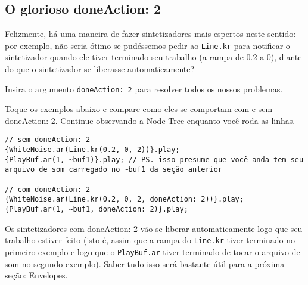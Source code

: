 \subsection{O glorioso doneAction: 2}

Felizmente, há uma maneira de fazer sintetizadores mais espertos neste sentido: por exemplo, não seria ótimo se pudéssemos pedir ao \texttt{Line.kr} para notificar o sintetizador quando ele tiver terminado seu trabalho (a rampa de 0.2 a 0), diante do que o sintetizador se liberasse automaticamente?


Insira o argumento \texttt{doneAction: 2} para resolver todos os nossos problemas.

Toque os exemplos abaixo e compare como eles se comportam com e sem doneAction: 2. Continue observando a Node Tree enquanto você roda as linhas.
 
\begin{lstlisting}[style=SuperCollider-IDE, basicstyle=\scttfamily\footnotesize]
// sem doneAction: 2
{WhiteNoise.ar(Line.kr(0.2, 0, 2))}.play;
{PlayBuf.ar(1, ~buf1)}.play; // PS. isso presume que você anda tem seu arquivo de som carregado no ~buf1 da seção anterior

// com doneAction: 2
{WhiteNoise.ar(Line.kr(0.2, 0, 2, doneAction: 2))}.play;
{PlayBuf.ar(1, ~buf1, doneAction: 2)}.play;
\end{lstlisting}
 
Os sintetizadores com doneAction: 2 vão se liberar automaticamente logo que seu trabalho estiver feito (isto é, assim que a rampa do \texttt{Line.kr} tiver terminado no primeiro exemplo e logo que o \texttt{PlayBuf.ar} tiver terminado de tocar o arquivo de som no segundo exemplo). Saber tudo isso será bastante útil para a próxima seção: Envelopes.

